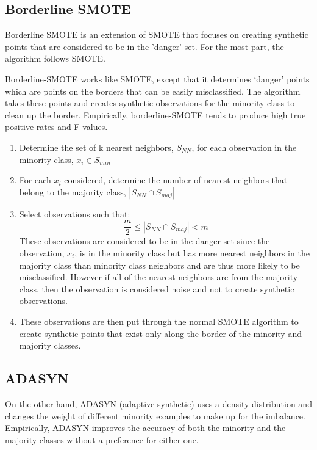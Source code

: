 \documentclass[a4paper]{article}
\begin{document}
\subsection{Borderline SMOTE}

Borderline SMOTE is an extension of SMOTE that focuses on creating synthetic points that are considered to be in the 'danger' set. For the most part, the algorithm follows SMOTE.

    Borderline-SMOTE works like SMOTE, except that it determines ‘danger’ points which are points on the borders that can be easily misclassified. The algorithm takes these points and creates synthetic observations for the minority class to clean up the border. Empirically, borderline-SMOTE tends to produce high true positive rates and F-values.%

\begin{enumerate}
\item Determine the set of k nearest neighbors, $S_{NN}$, for each observation in the minority class, $x_i\in S_{min}$
\item For each $x_i$ considered, determine the number of nearest neighbors that belong to the majority class, $|S_{NN}\cap S_{maj}|$
\item Select observations such that:
$$\frac{m}{2}\leq|S_{NN}\cap S_{maj}|<m$$
These observations are considered to be in the danger set since the observation, $x_i$, is in the minority class but has more nearest neighbors in the majority class than minority class neighbors and are thus more likely to be misclassified. However if all of the nearest neighbors are from the majority class, then the observation is considered noise and not to create synthetic observations.
\item These observations are then put through the normal SMOTE algorithm to create synthetic points that exist only along the border of the minority and majority classes. 
\end{enumerate}
  
\subsection{ADASYN}

 On the other hand, ADASYN (adaptive synthetic) uses a density distribution and changes the weight of different minority examples to make up for the imbalance.%
    Empirically, ADASYN improves the accuracy of both the minority and the majority classes without a preference for either one.%
\end{document}
